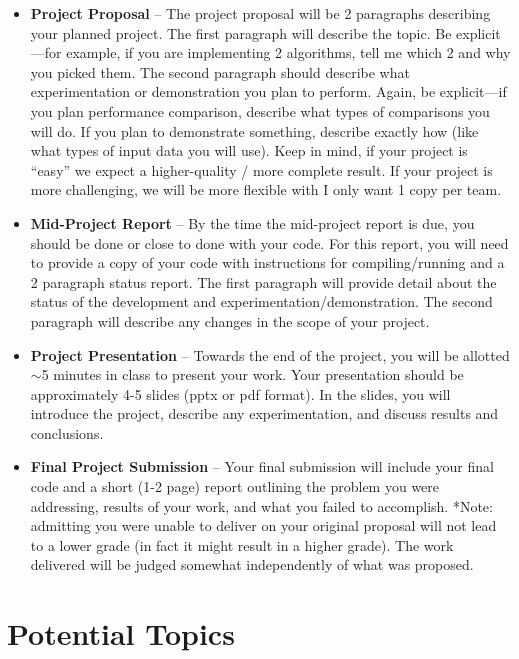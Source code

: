 \documentclass[a4paper,12pt]{article}
\begin{document}
\begin{itemize}
    \item \textbf{Project Proposal} -- The project proposal will be 2 paragraphs describing your planned project. The first paragraph will describe the topic. Be explicit---for example, if you are implementing 2 algorithms, tell me which 2 and why you picked them. The second paragraph should describe what experimentation or demonstration you plan to perform. Again, be explicit---if you plan performance comparison, describe what types of comparisons you will do. If you plan to demonstrate something, describe exactly how (like what types of input data you will use). Keep in mind, if your project is ``easy'' we expect a higher-quality / more complete result. If your project is more challenging, we will be more flexible with I only want 1 copy per team.
    
    \item \textbf{Mid-Project Report} -- By the time the mid-project report is due, you should be done or close to done with your code. For this report, you will need to provide a copy of your code with instructions for compiling/running and a 2 paragraph status report. The first paragraph will provide detail about the status of the development and experimentation/demonstration. The second paragraph will describe any changes in the scope of your project.
    
    \item \textbf{Project Presentation} -- Towards the end of the project, you will be allotted $\sim$5 minutes in class to present your work. Your presentation should be approximately 4-5 slides (pptx or pdf format). In the slides, you will introduce the project, describe any experimentation, and discuss results and conclusions. 

    \item \textbf{Final Project Submission} -- Your final submission will include your final code and a short (1-2 page) report outlining the problem you were addressing, results of your work, and what you failed to accomplish. *Note: admitting you were unable to deliver on your original proposal will not lead to a lower grade (in fact it might result in a higher grade). The work delivered will be judged somewhat independently of what was proposed.
        
\end{itemize}

\newpage

\section{Potential Topics}
\end{document}
